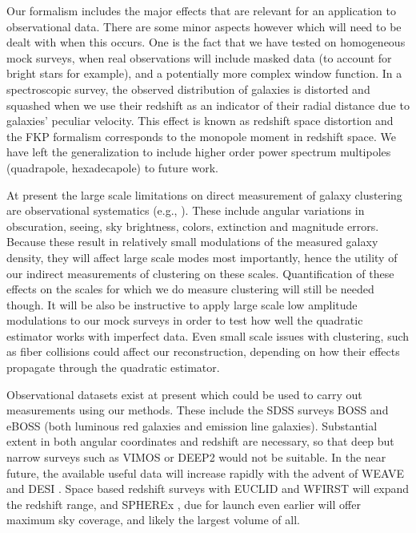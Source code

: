 \documentclass[prd,amsmath,amssymb,floatfix,superscriptaddress,nofootinbib,twocolumn]{revtex4-1}
\begin{document}
Our formalism includes the major effects that are relevant for an application to observational data. There are some minor aspects however which will need to be dealt with when this occurs. One is the fact that we have tested on homogeneous mock surveys, when real observations will include masked data (to account for bright stars for example), and a potentially more complex window function. In a spectroscopic survey, the observed distribution of galaxies is distorted and squashed when we use their redshift as an indicator of their radial distance due to galaxies' peculiar velocity. This effect is known as redshift space distortion \cite{Kaiser:1987rsd} and the FKP formalism corresponds to the monopole moment in redshift space. We have left the generalization to include higher order power spectrum multipoles (quadrapole, hexadecapole) to future work.

At present the large scale limitations on direct measurement of galaxy clustering are observational systematics (e.g., \cite{Ho:2012sh}). These include angular variations in obscuration, seeing, sky brightness, colors, extinction and magnitude errors. Because these result in relatively small modulations of the measured galaxy density, they will affect large scale modes most importantly, hence the utility of our indirect measurements of clustering on these scales. Quantification of these effects on the scales for which we do measure clustering will still be needed though. It will be also be instructive to apply large scale low amplitude modulations to our mock surveys in order to test how well the quadratic estimator works with imperfect data. Even small scale issues with clustering, such as fiber collisions \cite{Hahn:2016kiy} could affect our reconstruction, depending on how their effects propagate through the quadratic estimator.

Observational datasets exist at present which could be used to carry out measurements using our methods. These include the SDSS surveys BOSS \cite{Dawson:2013boss} and eBOSS \cite{Dawson:2015wdb} (both luminous red galaxies and emission line galaxies). Substantial extent in both angular coordinates and redshift are necessary, so that deep but narrow surveys such as VIMOS \cite{Fevre:2014tna} or DEEP2 \cite{Coil:2005ap} would not be suitable. In the near future, the available useful data will increase rapidly with the advent of WEAVE \cite{Dalton:2014wv} and DESI \cite{DESI:2019ds}. Space based redshift surveys  with EUCLID \cite{Amiaux:2012ec} and WFIRST \cite{Wfirst:2012jg} will expand the redshift range, and SPHEREx \cite{Dore:2014cca}, due for launch even earlier will offer maximum sky coverage, and likely the largest volume of all.
\end{document}
